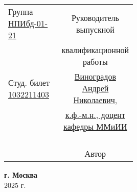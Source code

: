 \begin{titlepage}
  \vspace*{\fill}

  \noindent \begin{tabular}{p{0.5\linewidth} c}
      Группа \underline{НПИбд-01-21} & Руководитель выпускной  \\
      & квалификационной работы\\
      Студ. билет \textnumero{} \underline{1032211403} & \underline{Виноградов Андрей Николаевич,}\\
      & \underline{к.ф.-м.н., доцент кафедры ММиИИ} \\
      \\
      & \underline{\phantom{signature signature signature sig}} \\
      \\
      \\
      & Автор \underline{\phantom{signature signature signat}} \\
    \end{tabular}
   \vspace*{\fill}
   
  \begin{center} \textbf{г. Москва} \\ 2025 г. \end{center}
  \thispagestyle{empty} %
   
\end{titlepage}

\restoregeometry
